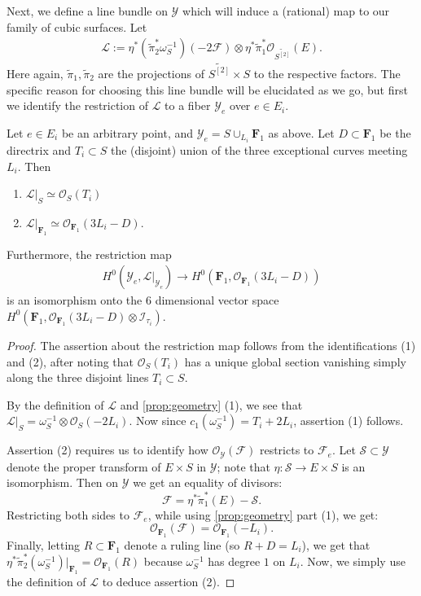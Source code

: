 \documentclass[12pt,reqno]{amsart}
\renewcommand{\to}{{\longrightarrow}}
\numberwithin{equation}{section}
\renewcommand{\O}{\mathcal O}
\newcommand{\F}{\mathbf F}
\newcommand{\td}{\widetilde}
\begin{document}
Next, we define a line bundle on $\mathcal{Y}$ which will induce a
(rational) map to our family of cubic surfaces.   Let
\begin{align}
  \label{eq:linebundle}
  \mathcal{L} :=\eta^{*} \left( \td{\pi}_{2}^{*}\omega_{S}^{-1} \right)(-2\mathcal{F})\otimes \eta^{*}\td{\pi}_{1}^{*}\O_{\td{S^{[2]}}}(E).
\end{align}
Here again, $\td{\pi}_{1}, \td{\pi}_{2}$ are the projections of
$\td{S^{[2]}} \times S$ to the respective factors. The specific reason for
choosing this line bundle will be elucidated as we go, but first we
identify the restriction of $\mathcal{L}$ to a fiber
$\mathcal{Y}_{e}$ over $e \in E_{i}$.
\begin{proposition}
  \label{prop:LYe}
  Let $e \in E_{i}$ be an arbitrary point, and $\mathcal{Y}_{e} = S \cup_{L_{i}} \F_{1}$ as above.
  Let $D \subset \F_1$ be the directrix and $T_i \subset S$ the (disjoint) union of the three exceptional curves meeting $L_i$.
  Then
  \begin{enumerate}
  \item $\mathcal{L}|_{S} \simeq \O_{S}(T_{i})$
  \item $\mathcal{L}|_{\F_{1}} \simeq \O_{\F_{1}}(3L_{i}-D)$.
  \end{enumerate}
  Furthermore, the restriction map
  \begin{align}
    \label{eq:restrL}
    H^{0}(\mathcal{Y}_{e}, \mathcal{L}|_{\mathcal{Y}_{e}}) \to H^{0}(\F_{1}, \O_{\F_{1}}(3L_{i}-D))
  \end{align}
  is an isomorphism onto the $6$ dimensional vector space
  $H^{0}\left(\F_{1}, \O_{\F_{1}}(3L_{i}-D) \otimes \mathcal{I}_{\tau_{i}}\right).$
\end{proposition}

\begin{proof}
  The assertion about the restriction map follows from the
  identifications (1) and (2), after noting that $\O_{S}(T_{i})$ has a
  unique global section vanishing simply along the three disjoint
  lines $T_{i} \subset S$.

  By the definition of $\mathcal{L}$ and \autoref{prop:geometry} (1),
  we see that
  $\mathcal{L}|_{S} = \omega_{S}^{-1} \otimes \O_{S}(-2L_{i})$. Now
  since $c_{1}( \omega_{S}^{-1}) = T_{i} + 2L_{i}$, assertion (1) follows.

  Assertion (2) requires us to identify how
  $\O_{\mathcal{Y}}(\mathcal{F})$ restricts to $\mathcal{F}_{e}$. Let
  $\mathcal{S} \subset \mathcal{Y}$ denote the proper transform of
  $E \times S$ in $\mathcal{Y}$; note that
  $\eta: \mathcal{S} \to E \times S$ is an isomorphism.  Then on
  $\mathcal{Y}$ we get an equality of divisors:
  \[\mathcal{F} = \eta^{*}\td{\pi}_{1}^{*}(E) - \mathcal{S}.\]
  Restricting both sides to $\mathcal{F}_{e}$, while using
  \autoref{prop:geometry} part (1), we get:
  \[\O_{\F_{1}}(\mathcal{F}) = \O_{\F_{1}}(-L_{i}).\] Finally, letting
  $R \subset \F_{1}$ denote a ruling line (so $R+D = L_{i}$), we get
  that
  $\eta^{*}\td{\pi}_{2}^{*}(\omega_{S}^{-1})|_{\F_{1}} =
  \O_{\F_{1}}(R)$ because $\omega_{S}^{-1}$ has degree $1$ on $L_{i}$.
  Now, we simply use the definition of $\mathcal{L}$ to deduce
  assertion (2).
\end{proof}
\end{document}
